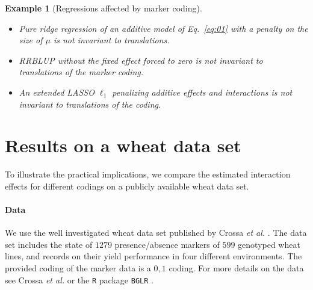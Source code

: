 \documentclass{bmcart}
\newtheorem{example}{Example}
\newcommand{\0}{\mathbf{0}}
\begin{document}
\begin{example}[Regressions affected by marker coding]~\\
	\begin{itemize} \item[a)] Pure ridge regression of an additive model of Eq.~\ref{eq:01} with a penalty on the size of $\mu$ is not invariant to translations. 
		\item[b)] RRBLUP without the fixed effect forced to zero is not invariant to translations of the marker coding.
				\item[c)] An extended LASSO $\ell_1$ penalizing additive effects and interactions is not invariant to translations of the coding.
	\end{itemize}
\end{example} 
\section*{Results on a wheat data set}

To illustrate the practical implications, we compare the estimated interaction effects for different codings on a publicly available wheat data set.
  
\paragraph{Data} We use the well investigated wheat data set published by Crossa {\it et al.} \cite{Crossa10}. The data set includes the state of $1279$ presence/absence markers of $599$ genotyped wheat lines, and records on their yield performance in four different environments. The provided coding of the marker data is a $0,1$ coding. For more details on the data see Crossa {\it et al.} \cite{Crossa10} or the \texttt{R} \cite{RCoreTeam2016R:Computing} package \texttt{BGLR} \cite{BGLR}. 
\end{document}

